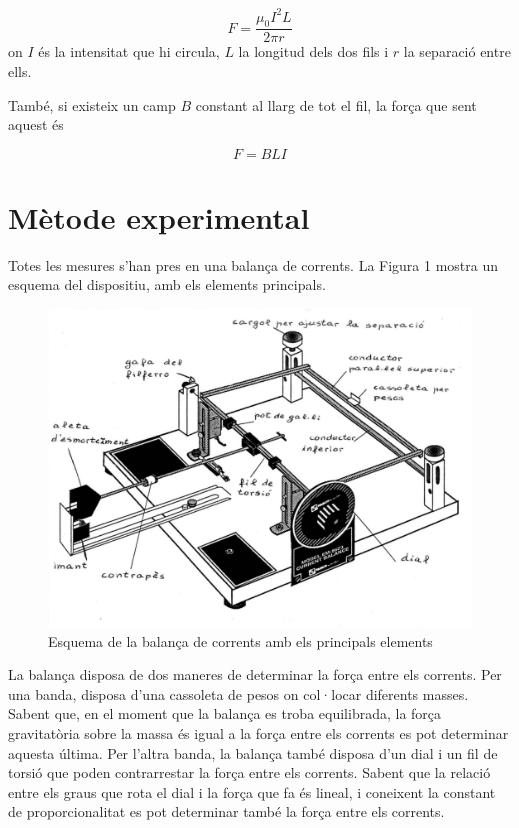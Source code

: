 \begin{equation}
F=\frac{\mu_0I^2L}{2\pi r}
\end{equation}
on $I$ és la intensitat que hi circula, $L$ la longitud dels dos fils i $r$ la separació entre ells.

També, si existeix un camp $B$ constant al llarg de tot el fil, la força que sent aquest és

\begin{equation}
	F=BLI
\end{equation}

\section{Mètode experimental}
Totes les mesures s'han pres en una balança de corrents. La Figura 1 mostra un esquema del dispositiu, amb els elements principals.
\begin{figure}
	\centering
	\includegraphics[scale=0.5]{Fig1.png}
	\caption{Esquema de la balança de corrents amb els principals elements}
\end{figure}

La balança disposa de dos maneres de determinar la força entre els corrents. Per una banda, disposa d'una cassoleta de pesos on col·locar diferents masses. Sabent que, en el moment que la balança es troba equilibrada, la força gravitatòria sobre la massa és igual a la força entre els corrents es pot determinar aquesta última. Per l'altra banda, la balança també disposa d'un dial i un fil de torsió que poden contrarrestar la força entre els corrents. Sabent que la relació entre els graus que rota el dial i la força que fa és lineal, i coneixent la constant de proporcionalitat es pot determinar també la força entre els corrents.

